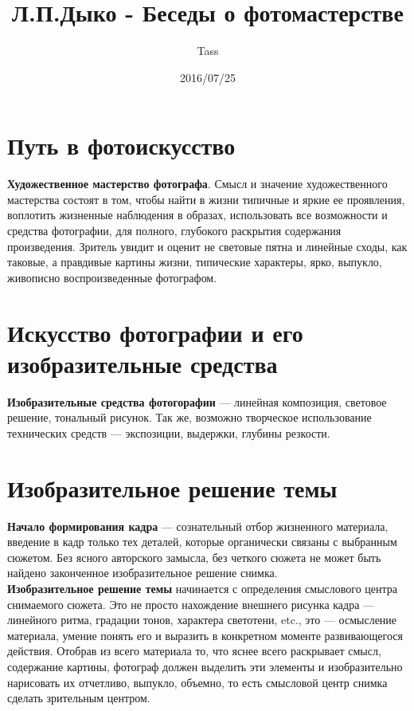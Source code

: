 \documentclass{article}
\begin{document}
\title{Л.П.Дыко - Беседы о фотомастерстве}
\author{Tass}
\date{2016/07/25}
\maketitle

\tableofcontents
\newpage
\section{Путь в фотоискусство}
\textbf{Художественное мастерство фотографа}. Смысл и значение художественного мастерства состоят в том, чтобы найти в жизни типичные и яркие ее проявления, воплотить жизненные наблюдения в образах, использовать все возможности и средства фотографии, для полного, глубокого раскрытия содержания произведения. Зритель увидит и оценит не световые пятна и линейные сходы, как таковые, а правдивые картины жизни, типические характеры, ярко, выпукло, живописно воспроизведенные фотографом.

\section{Искусство фотографии и его изобразительные средства}
\textbf{Изобразительные средства фотогорафии} --- линейная композиция, световое решение, тональный рисунок. Так же, возможно творческое использование технических средств --- экспозиции, выдержки, глубины резкости.

\section{Изобразительное решение темы}
\textbf{Начало формирования кадра} --- сознательный отбор жизненного материала, введение в кадр только тех деталей, которые органически связаны с выбранным сюжетом. Без ясного авторского замысла, без четкого сюжета не может быть найдено законченное изобразительное решение снимка.
\\
\textbf{Изобразительное решение темы} начинается с определения смыслового центра снимаемого сюжета. Это не просто нахождение внешнего рисунка кадра --- линейного ритма, градации тонов, характера светотени, etc., это --- осмысление материала, умение понять его и выразить в конкретном моменте развивающегося действия. Отобрав из всего материала то, что яснее всего раскрывает смысл, содержание картины, фотограф должен выделить эти элементы и изобразительно нарисовать их отчетливо, выпукло, объемно, то есть смысловой центр снимка сделать зрительным центром.
\end{document}
